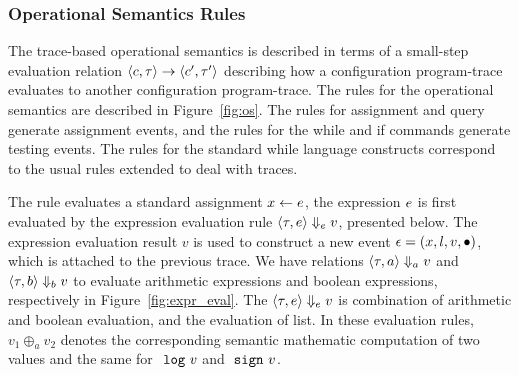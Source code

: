  \subsubsection{Operational Semantics Rules}
 The trace-based operational semantics is described in terms of a small-step evaluation relation
 $\langle c, \mathtt{\tau} \rangle \to \langle c', \mathtt{\tau}' \rangle$ describing how a configuration program-trace evaluates to another
 configuration program-trace. 
 The rules for the operational semantics are described in Figure~\ref{fig:os}.
 The rules for assignment and query generate assignment events, and the rules for the while and if commands generate testing events. 
 The rules for the standard while language constructs correspond to the usual rules extended to deal with traces. 

The rule  evaluates a standard assignment $\mathrel{ x \leftarrow e }$, the expression $e$ is first evaluated by the expression evaluation rule $\langle \mathtt{\tau}, e \rangle \Downarrow_e v $, presented below.
The expression evaluation result $v$ is used to construct a new event $\mathtt{\epsilon} = (x, l, v,\bullet)$, which is attached to the previous trace.
We have relations $\langle \mathtt{\tau}, a \rangle \Downarrow_a v $ and $\langle \mathtt{\tau}, b \rangle \Downarrow_b v $ to evaluate arithmetic expressions and boolean expressions, respectively in Figure~\ref{fig:expr_eval}.
The $\langle \mathtt{\tau}, e \rangle \Downarrow_e v $ is combination of arithmetic and boolean evaluation, and the evaluation of list.
In these evaluation rules, $v_1 \oplus_a v_2$ denotes the corresponding semantic mathematic computation of two values and the same for $~\mathtt{log}~ v$ and $~\mathtt{sign}~ v$.

